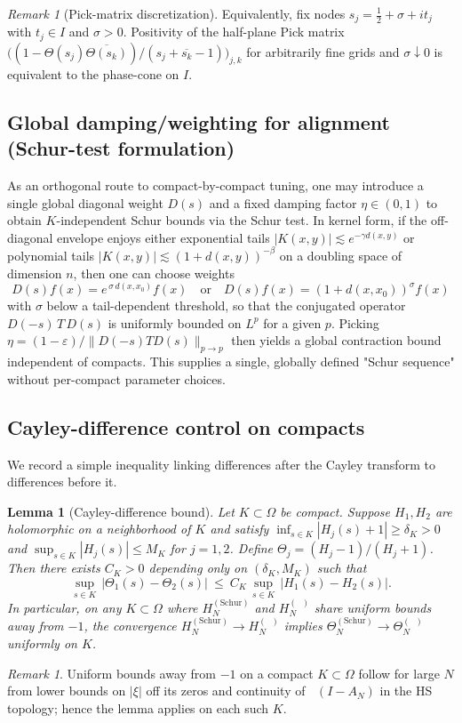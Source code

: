 \documentclass[11pt]{article}
\newtheorem{lemma}[theorem]{Lemma}
\theoremstyle{definition}
\theoremstyle{remark}
\newtheorem{remark}[theorem]{Remark}
\DeclareMathOperator{\dettwo}{det_2}
\begin{document}
\begin{remark}[Pick-matrix discretization]\label{rem:pick-certificate}
Equivalently, fix nodes $s_j=\tfrac12+\sigma+i t_j$ with $t_j\in I$ and $\sigma>0$. Positivity of the half-plane Pick matrix \(\big((1-\Theta(s_j)\overline{\Theta(s_k)})/(s_j+\overline{s_k}-1)\big)_{j,k}\) for arbitrarily fine grids and $\sigma\downarrow 0$ is equivalent to the phase-cone on $I$.
\end{remark}

\subsection{Global damping/weighting for alignment (Schur-test formulation)}\label{subsec:global-damping}
As an orthogonal route to compact-by-compact tuning, one may introduce a single global diagonal weight \(D(s)\) and a fixed damping factor \(\eta\in(0,1)\) to obtain \(K\)-independent Schur bounds via the Schur test. In kernel form, if the off-diagonal envelope enjoys either exponential tails \(|K(x,y)|\lesssim e^{-\gamma d(x,y)}\) or polynomial tails \(|K(x,y)|\lesssim (1+d(x,y))^{-\beta}\) on a doubling space of dimension \(n\), then one can choose weights
\[
 D(s)f(x)=e^{\,\sigma\,d(x,x_0)}f(x)\quad\text{or}\quad D(s)f(x)=(1+d(x,x_0))^{\sigma} f(x)
\]
with \(\sigma\) below a tail-dependent threshold, so that the conjugated operator \(D(-s)\,T\,D(s)\) is uniformly bounded on \(L^p\) for a given \(p\). Picking \(\eta=(1-\varepsilon)/\|D(-s)TD(s)\|_{p\to p}\) then yields a global contraction bound independent of compacts. This supplies a single, globally defined "Schur sequence" without per-compact parameter choices.

\subsection{Cayley-difference control on compacts}\label{subsec:Cayley-difference}
We record a simple inequality linking differences after the Cayley transform to differences before it.

\begin{lemma}[Cayley-difference bound]\label{lem:Cayley-diff}
Let \(K\subset\Omega\) be compact. Suppose \(H_1,H_2\) are holomorphic on a neighborhood of \(K\) and satisfy \(\inf_{s\in K}|H_j(s)+1|\ge \delta_K>0\) and \(\sup_{s\in K}|H_j(s)|\le M_K\) for \(j=1,2\). Define \(\Theta_j=(H_j-1)/(H_j+1)\). Then there exists \(C_K>0\) depending only on \((\delta_K,M_K)\) such that
\[
 \sup_{s\in K}\,\big|\Theta_1(s)-\Theta_2(s)\big|\ \le\ C_K\,\sup_{s\in K}\,\big|H_1(s)-H_2(s)\big|.
\]
In particular, on any \(K\subset\Omega\) where \(H_N^{(\mathrm{Schur})}\) and \(H_N^{(\dettwo)}\) share uniform bounds away from \(-1\), the convergence \(H_N^{(\mathrm{Schur})}\to H_N^{(\dettwo)}\) implies \(\Theta_N^{(\mathrm{Schur})}\to \Theta_N^{(\dettwo)}\) uniformly on \(K\).
\end{lemma}
\begin{remark}
Uniform bounds away from \(-1\) on a compact \(K\subset\Omega\) follow for large \(N\) from lower bounds on \(|\xi|\) off its zeros and continuity of \(\dettwo(I-A_N)\) in the HS topology; hence the lemma applies on each such \(K\).
\end{remark}
\end{document}
